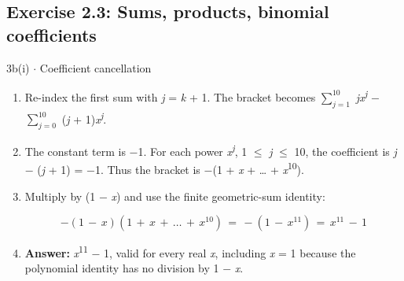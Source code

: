 \documentclass[11pt]{article}
\begin{document}
\begin{keepsection}\subsection{Exercise 2.3: Sums, products, binomial coefficients}

\begin{workedbox}{3b(i) \ensuremath{\cdot} Coefficient cancellation}
\begin{enumerate}
\item Re-index the first sum with \textit{j} = \textit{k} + 1. The bracket becomes $\sum_{{j}=1}^{10} $ \textit{j}\textit{x}\textsuperscript{\textit{j}} \ensuremath{-} $\sum_{{j}=0}^{10} $ (\textit{j} + 1)\textit{x}\textsuperscript{\textit{j}}.
\item The constant term is \ensuremath{-}1. For each power \textit{x}\textsuperscript{\textit{j}}, 1 \ensuremath{\leq} \textit{j} \ensuremath{\leq} 10, the coefficient is \textit{j} \ensuremath{-} (\textit{j} + 1) = \ensuremath{-}1. Thus the bracket is \ensuremath{-}(1 + \textit{x} + … + \textit{x}\textsuperscript{10}).
\item {}
Multiply by (1 \ensuremath{-} \textit{x}) and use the finite geometric-sum identity:

\begin{equation*}-(1\, -\, {x})(1\, +\, {x}\, +\, …\, +\, {x}^{10})\, =\, -(1\, -\, {x}^{11})\, =\, {x}^{11}\, -\, 1\end{equation*}
\item \textbf{Answer:} \textit{x}\textsuperscript{11} \ensuremath{-} 1, valid for every real \textit{x}, including \textit{x} = 1 because the polynomial identity has no division by 1 \ensuremath{-} \textit{x}.
\end{enumerate}
\end{workedbox}

\end{keepsection}
\end{document}
